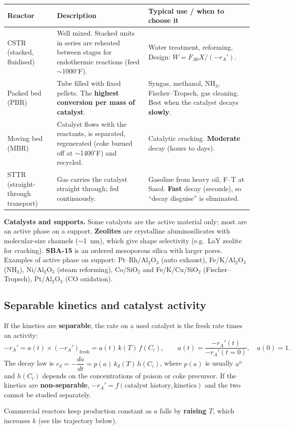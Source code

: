 \documentclass[11pt]{article}
\begin{document}
\begin{center}
\renewcommand{\arraystretch}{1.25}
\begin{tabularx}{\textwidth}{l X X}
\toprule
Reactor & Description & Typical use / when to choose it\\
\midrule
CSTR (stacked, fluidised) & Well mixed. Stacked units in series are reheated between stages for endothermic reactions (feed $\sim$1000$^\circ$F). & Water treatment, reforming. Design: $W=F_{A0}X/(-r_A')$.\\
Packed bed (PBR) & Tube filled with fixed pellets. The \textbf{highest conversion per mass of catalyst}. & Syngas, methanol, NH$_3$, Fischer--Tropsch, gas cleaning. Best when the catalyst decays \textbf{slowly}.\\
Moving bed (MBR) & Catalyst flows with the reactants, is separated, regenerated (coke burned off at $\sim$1400$^\circ$F) and recycled. & Catalytic cracking. \textbf{Moderate} decay (hours to days).\\
STTR (straight-through transport) & Gas carries the catalyst straight through; fed continuously. & Gasoline from heavy oil, F--T at Sasol. \textbf{Fast} decay (seconds), so ``decay disguise'' is eliminated.\\
\bottomrule
\end{tabularx}
\end{center}

\textbf{Catalysts and supports.} Some catalysts are the active material only; most are an active phase on a support.
\textbf{Zeolites} are crystalline aluminosilicates with molecular-size channels ($\sim$1~nm), which give shape
selectivity (e.g.\ LaY zeolite for cracking). \textbf{SBA-15} is an ordered mesoporous silica with larger pores.
Examples of active phase on support: Pt--Rh/Al$_2$O$_3$ (auto exhaust), Fe/K/Al$_2$O$_3$ (NH$_3$),
Ni/Al$_2$O$_3$ (steam reforming), Co/SiO$_2$ and Fe/K/Cu/SiO$_2$ (Fischer--Tropsch), Pt/Al$_2$O$_3$ (CO oxidation).

\subsection{Separable kinetics and catalyst activity}
\begin{keyresult}[Activity]
If the kinetics are \textbf{separable}, the rate on a used catalyst is the fresh rate times an activity:
\[
-r_A'=a(t)\times\left(-r_A'\right)_{\text{fresh}}=a(t)\,k(T)\,f(C_i),\qquad
a(t)=\frac{-r_A'(t)}{-r_A'(t=0)},\quad a(0)=1 .
\]
The decay law is $r_d=-\dfrac{da}{dt}=p(a)\,k_d(T)\,h(C_i)$, where $p(a)$ is usually $a^n$ and $h(C_i)$ depends on the
concentrations of poison or coke precursor.
If the kinetics are \textbf{non-separable}, $-r_A'=f(\text{catalyst history},\text{kinetics})$ and the two cannot be studied separately.
\end{keyresult}
Commercial reactors keep production constant as $a$ falls by \textbf{raising $T$}, which increases $k$ (see the trajectory below).
\end{document}
